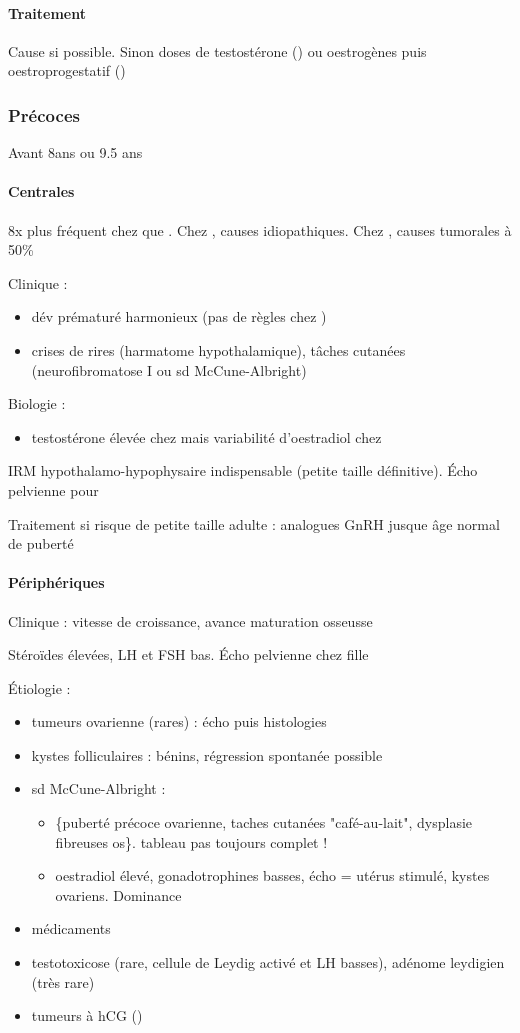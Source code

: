 \documentclass[11pt]{article}
\begin{document}
\paragraph{Traitement}
\label{sec:org4e7fc15}
Cause si possible. Sinon doses \inc de testostérone (\male) ou oestrogènes puis
oestroprogestatif (\female)
\subsubsection{Précoces}
\label{sec:orgb9ca11d}
Avant 8ans \female ou 9.5 ans \male
\paragraph{Centrales}
\label{sec:org7c5b8a9}
8x plus fréquent chez \female{} que \male{}. Chez \female{}, causes
idiopathiques. Chez \male{}, causes tumorales à 50\%

Clinique : 
\begin{itemize}
\item dév prématuré harmonieux (pas de règles chez \female)
\item crises de rires (harmatome hypothalamique), tâches cutanées (neurofibromatose
I ou sd McCune-Albright)
\end{itemize}
Biologie :
\begin{itemize}
\item testostérone élevée chez \male{} mais variabilité d'oestradiol chez \female{}
\end{itemize}

IRM hypothalamo-hypophysaire indispensable \danger (petite taille
définitive). Écho pelvienne pour \female{}

Traitement si risque de petite taille adulte : analogues GnRH jusque âge normal
de puberté
\paragraph{Périphériques}
\label{sec:org87cc5b4}
Clinique : \inc vitesse de croissance, avance maturation osseusse

Stéroïdes élevées, LH et FSH bas. Écho pelvienne chez fille

Étiologie :
\begin{itemize}
\item tumeurs ovarienne (rares) : écho puis histologies
\item kystes folliculaires : bénins, régression spontanée possible
\item sd McCune-Albright : 
\begin{itemize}
\item \{puberté précoce ovarienne, taches cutanées "café-au-lait", dysplasie fibreuses os\}. \danger tableau pas toujours complet !
\item oestradiol élevé, gonadotrophines basses, écho = utérus stimulé, kystes ovariens. Dominance \female
\end{itemize}
\item médicaments
\item testotoxicose (rare, cellule de Leydig activé et LH basses), adénome leydigien
(très rare)
\item tumeurs à hCG (\male)
\end{itemize}
\end{document}
